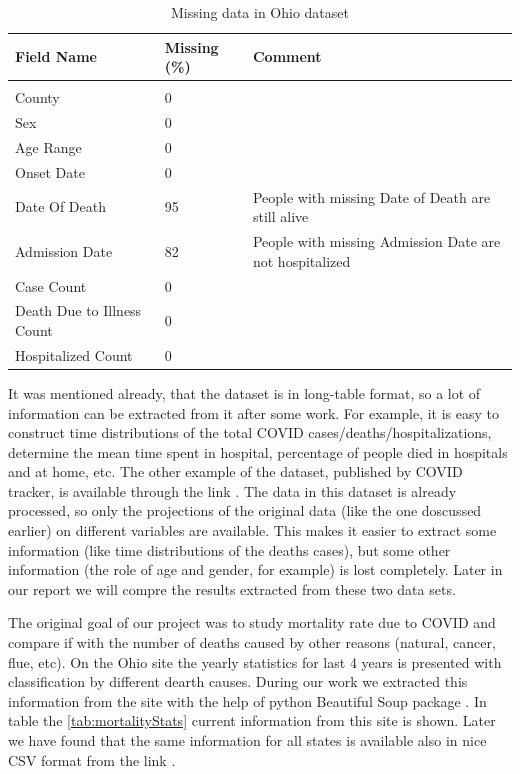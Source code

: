 \documentclass[conference]{IEEEtran}
\begin{document}
\begin{table}[b]
  \centering
  \begin{tabular}{lll}
    \toprule
    Field Name & Missing (\%) & Comment\\
    \midrule\\
    County & 0 & \\
    Sex & 0 & \\
    Age Range & 0 & \\
               Onset Date & 0 & \\
               Date Of Death & 95 & People with missing Date of Death are still alive \\
               Admission Date &  82 & People with missing Admission Date are not hospitalized \\
               Case Count & 0 & \\
               Death Due to Illness Count & 0& \\
               Hospitalized Count & 0 & \\
    \bottomrule
  \end{tabular}
  \caption{Missing data in Ohio dataset}
  \label{tab:Ohio:missing}
\end{table}


It was mentioned already, that the dataset is in long-table format, so a lot of information can be extracted from it after some work. For example, it is easy to construct time distributions of the total COVID cases/deaths/hospitalizations, determine the mean time spent in hospital, percentage of people died in hospitals and at home, etc. The other example of the dataset, published by COVID tracker, is available through the link \cite{COVIDTracker}. The data in this dataset is already processed, so only the projections of the original data (like the one doscussed earlier) on different variables are available. This makes it easier to extract some information (like time distributions of the deaths cases), but some other information (the role of age and gender, for example) is lost completely. Later in our report we will compre the results extracted from these two data sets.

The original goal of our project was to study mortality rate due to COVID and compare if with the number of deaths caused by other reasons (natural, cancer, flue, etc). On the Ohio site \cite{NCHSohio} the yearly statistics for last 4 years is presented with classification by different dearth causes. During our work we extracted this information from the site with the help of python Beautiful Soup package \cite{bs4}. In table the \ref{tab:mortalityStats} current information from this site is shown. Later we have found that the same information for all states is available also in nice CSV format from the link \cite{CDCmortality}. 
\end{document}
